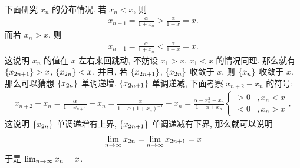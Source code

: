 \begin{exercise}[resume=exer]
\begin{answer}
            下面研究 $ x_{n} $ 的分布情况. 若 $ x_{n} < x $, 则
            \begin{align*}
                x_{n + 1} = \frac{\alpha}{1 + x_{n}} > \frac{\alpha}{1 + x} = x.
            \end{align*}
            而若 $ x_{n} > x $, 则
            \begin{align*}
                x_{n + 1} = \frac{\alpha}{1 + x_{n}} < \frac{\alpha}{1 + x} = x.
            \end{align*}
            这说明 $ x_{n} $ 的值在 $ x $ 左右来回跳动, 不妨设 $ x_{1} > x $, $ x_{1} < x $ 的情况同理. 那么就有 $ \qty{x_{2n + 1}} > x $, $ \qty{x_{2n}} < x $, 并且, 若 $ \qty{x_{2n + 1}} $, $ \qty{x_{2n}} $ 收敛于 $ x $, 则 $ \qty{x_{n}} $ 收敛于 $ x $.
            那么可以猜想 $ \qty{x_{2n}} $ 单调递增, $ \qty{x_{2n + 1}} $ 单调递减, 下面考察 $ x_{n + 2} - x_{n} $ 的符号:
            \begin{align*}
                x_{n + 2} - x_{n} = \frac{\alpha}{1 + x_{n + 1}} - x_{n} = \frac{\alpha}{1 + \alpha(1 + x_{n})^{-1}} - x_{n} = \frac{\alpha - x_{n}^{2} - x_{n}}{1 + \alpha + x_{n}}
                \begin{cases}
                    > 0 & , x_{n} < x\\
                    < 0 & , x_{n} > x
                \end{cases},
            \end{align*}
            这说明 $ \qty{x_{2n}} $ 单调递增有上界, $ \qty{x_{2n + 1}} $ 单调递减有下界, 那么就可以说明
            \begin{align*}
                \lim_{n \to \infty}x_{2n} = \lim_{n \to \infty}x_{2n + 1} = x
            \end{align*} 
            于是 $ \lim_{n \to \infty}x_{n} = x $.
        \end{answer}
    \end{exercise}
    \stopexercise